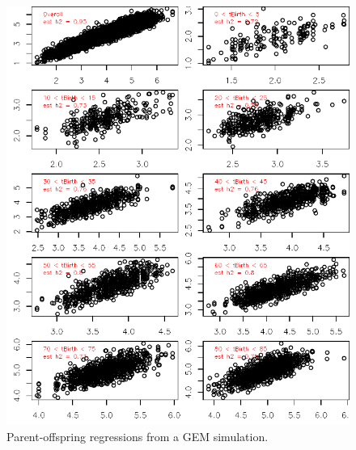 \documentclass[12pt,reqno,final,pdftex]{amsart}\usepackage[]{graphicx}\usepackage[]{color}
\newenvironment{knitrout}{}{} %
\theoremstyle{plain}
\numberwithin{equation}{part}
\begin{document}
\begin{knitrout}\scriptsize
{}\color{fgcolor}\begin{figure}

\includegraphics[width=\linewidth]{figure/unnamed-chunk-5-1} \hfill{}

\caption[Parent-offspring regressions from a GEM simulation]{Parent-offspring regressions from a GEM simulation.}\label{fig:unnamed-chunk-5}
\end{figure}


\end{knitrout}
\end{document}
